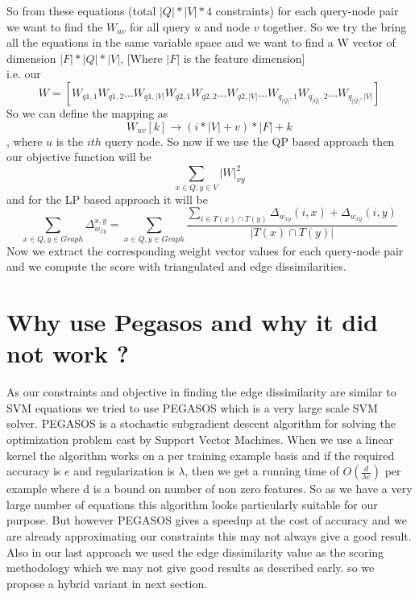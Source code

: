 So from these equations (total $|Q| * |V| * 4$ constraints) for each query-node pair  we want to find the $W_{uv}$ for all query $u$ and node $v$ together. So we try the bring all the equations in the same variable space and we want to find a W vector of dimension $|F|*|Q|*|V|$, [Where $|F|$ is the feature dimension]\\
i.e. our $$W = [W_{q1,1} W_{q1,2} ... W_{q1,|V|} W_{q2,1} W_{q2, 2} ... W_{q2,|V|}... W_{q_{|Q|},1} W_{q_{|Q|}, 2} ... W_{q_{|Q|}, |V|}]$$
So we can define the mapping as
\begin{equation}
W_{uv} [k] \rightarrow (i*|V|+v)*|F| + k 
\end{equation}
, where $u$ is the $ith$ query node.
So now if we use the QP based approach then our objective function will be
\begin{equation}
\sum_{x \in Q, y \in V} |W|_{xy}^2
\end{equation}
and for the LP based approach it will be
\begin{equation}
\sum_{x \in Q,y \in Graph} \Delta_{w_{xy}}^{x,y} = \sum_{x \in Q,y \in Graph} \frac{\sum_{i \in T(x) \cap T(y)} \Delta_{w_{xy}}(i,x) + \Delta_{w_{xy}}(i,y)}{ |T(x) \cap T(y)|}
\end{equation}
Now we extract the corresponding weight vector values for each query-node pair and we compute the score with triangulated and edge dissimilarities.

\section*{Why use Pegasos and why it did not work ?}
As our constraints and objective in finding the edge dissimilarity are similar to SVM equations we tried to use PEGASOS which is a very large scale SVM solver. PEGASOS is a stochastic subgradient descent algorithm for solving the optimization problem cast by Support Vector Machines. When we use a linear kernel the algorithm works on a per training example basis and if the required accuracy is $e$ and regularization is $\lambda$, then we get a running time of $O(\frac {d}{\lambda e})$ per example where d is a bound on number of non zero features. So as we have a very large number of equations this algorithm looks particularly suitable for our purpose. But however PEGASOS gives a speedup at the cost of accuracy and we are already approximating our constraints this may not always give a good result. Also in our last approach we used the edge dissimilarity value as the scoring methodology which we may not give good results as described early. so we propose a hybrid variant in next section.


